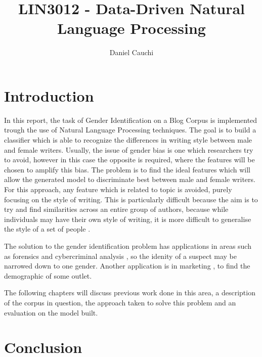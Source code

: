 \documentclass{article}
\begin{document}
\title{LIN3012 - Data-Driven Natural Language Processing}
\author{Daniel Cauchi}
\date{}
\maketitle


\section{Introduction}
In this report, the task of Gender Identification on a Blog Corpus is implemented trough the use of Natural Language Processing techniques. The goal is to build a classifier which is able to recognize the differences in writing style between male and female writers. Usually, the issue of gender bias is one which researchers try to avoid, however in this case the opposite is required, where the features will be chosen to amplify this bias. The problem is to find the ideal features which will allow the generated model to discriminate best between male and female writers. For this approach, any feature which is related to topic is avoided, purely focusing on the style of writing. This is particularly difficult because the aim is to try and find similarities across an entire group of authors, because while individuals may have their own style of writing, it is more difficult to generalise the style of a set of people \cite{3}.


The solution to the gender identification problem has applications in areas such as forensics \cite{2, 6} and cybercriminal analysis \cite{1}, so the idenity of a suspect may be narrowed down to one gender. Another application is in marketing \cite{6}, to find the demographic of some outlet.

The following chapters will discuss previous work done in this area, a description of the corpus in question, the approach taken to solve this problem and an evaluation on the model built.




\section{Conclusion}





\pagebreak


\end{document}
